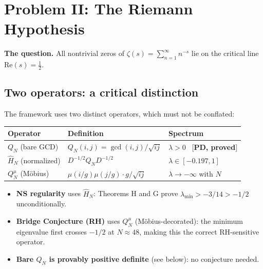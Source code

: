 \documentclass[12pt]{article}
\begin{document}

\newpage
\section{Problem II: The Riemann Hypothesis}
\label{sec:rh}

\textbf{The question.}
All nontrivial zeros of $\zeta(s) = \sum_{n=1}^\infty n^{-s}$ lie on
the critical line $\mathrm{Re}(s) = \tfrac{1}{2}$.

\subsection{Two operators: a critical distinction}
\label{subsec:two-ops}

The framework uses two distinct operators, which must not be conflated:

\begin{center}
\renewcommand{\arraystretch}{1.6}
\small
\begin{tabular}{@{}lll@{}}
\toprule
\textbf{Operator} & \textbf{Definition} & \textbf{Spectrum} \\
\midrule
$Q_N$ (bare GCD) & $Q_N(i,j) = \gcd(i,j)/\!\sqrt{ij}$ & $\lambda > 0$ \ [\textbf{PD, proved}] \\
$\hat{H}_N$ (normalized) & $D^{-1/2}Q_N D^{-1/2}$ & $\lambda \in [-0.197, 1]$ \\
$Q_N^{\mu}$ (M\"{o}bius) & $\mu(i/g)\mu(j/g) \cdot g/\!\sqrt{ij}$ & $\lambda \to -\infty$ with $N$ \\
\bottomrule
\end{tabular}
\end{center}

\begin{itemize}[itemsep=3pt]
  \item \textbf{NS regularity} uses $\hat{H}_N$: Theorems H and G prove $\lambda_{\min} > -3/14 > -1/2$ unconditionally.
  \item \textbf{Bridge Conjecture (RH)} uses $Q_N^{\mu}$ (M\"{o}bius-decorated): the minimum eigenvalue
    first crosses $-1/2$ at $N \approx 48$, making this the correct RH-sensitive operator.
  \item \textbf{Bare $Q_N$ is provably positive definite} (see below): no conjecture needed.
\end{itemize}
\end{document}
